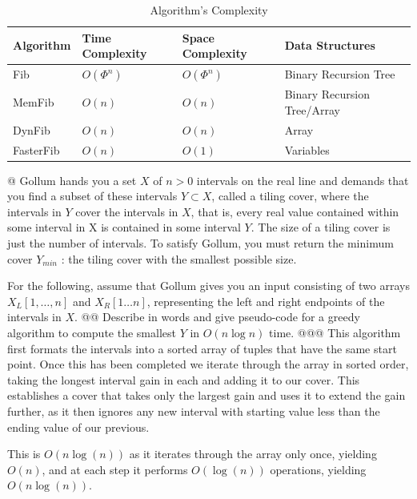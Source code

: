 \documentclass[10pt]{article}
\begin{document}
\begin{easylist}[enumerate]
    \begin{table}[!ht]
        \centering
        \begin{tabular}{|l|lll|}
            \hline
            Algorithm & Time Complexity & Space Complexity & Data Structures\\
            \hline
            Fib       & $O(\Phi^n)$ & $O(\Phi^n)$ & Binary Recursion Tree\\
            MemFib    & $O(n)$ & $O(n)$ & Binary Recursion Tree/Array\\
            DynFib    & $O(n)$ & $O(n)$ & Array\\
            FasterFib & $O(n)$ & $O(1)$ & Variables\\
            \hline
        \end{tabular}
        \caption{Algorithm's Complexity}
        \label{table:algorithms}
    \end{table}

    @ Gollum hands you a set $X$ of $n > 0$ intervals on the real line and demands that you find a subset of these
    intervals $Y \subset X$, called a tiling cover, where the intervals in $Y$ cover the intervals in $X$, that is,
    every real value contained within some interval in X is contained in some interval $Y$. The size of a tiling cover
    is just the number of intervals. To satisfy Gollum, you must return the minimum cover $Y_{min}$ : the tiling cover
    with the smallest possible size.\newline

    For the following, assume that Gollum gives you an input consisting of two arrays $X_L [1, \ldots, n]$ and $X_R [1
    \ldots n]$, representing the left and right endpoints of the intervals in $X$.
    @@ Describe in words and give pseudo-code for a greedy algorithm to compute the smallest $Y$ in $O(n \log n)$ time.
    @@@ This algorithm first formats the intervals into a sorted array of tuples that have the same start point. Once
    this has been completed we iterate through the array in sorted order, taking the longest interval gain in each and
    adding it to our cover. This establishes a cover that takes only the largest gain and uses it to extend the gain
    further, as it then ignores any new interval with starting value less than the ending value of our previous.

    This is $O(n \log(n))$ as it iterates through the array only once, yielding $O(n)$, and at each step it performs
    $O(\log(n))$ operations, yielding $O(n \log(n))$.


\end{easylist}
\end{document}
